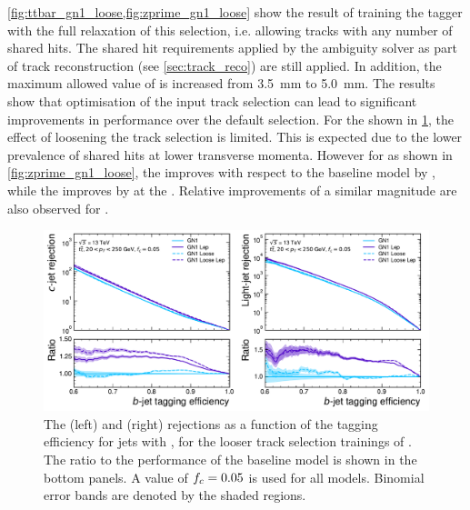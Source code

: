 \cref{fig:ttbar_gn1_loose,fig:zprime_gn1_loose} show the result of training the \GNN tagger with the full relaxation of this selection, i.e. allowing tracks with any number of shared hits.
The shared hit requirements applied by the ambiguity solver as part of track reconstruction (see \cref{sec:track_reco}) are still applied.
In addition, the maximum allowed value of \dzero is increased from \SI{3.5}{\milli\meter} to \SI{5.0}{\milli\meter}.
The results show that optimisation of the input track selection can lead to significant improvements in performance over the default selection.
For the \ttbarjets shown in \cref{fig:ttbar_gn1_loose}, the effect of loosening the track selection is limited.
This is expected due to the lower prevalence of shared hits at lower transverse momenta.
However for \Zprimejets as shown in \cref{fig:zprime_gn1_loose}, the \crej improves with respect to the baseline \GNN model by , while the \lrej improves by  at the .
Relative improvements of a similar magnitude are also observed for \GNNLep.


\begin{figure}[!p]
    \centering
    \includegraphics[width=\textwidth]{chapters/gnn_tagger/figs/gn1_loose_ttbar.pdf}
    \caption{
        The \cjet (left) and \ljet (right) rejections as a function of the \bjet tagging efficiency for \ttbar jets with \ttbarpt, for the looser track selection trainings of \GNN.
        The ratio to the performance of the baseline \GNN model is shown in the bottom panels.
        A value of $f_c = 0.05$ is used for all models.
        Binomial error bands are denoted by the shaded regions.
    }
    \label{fig:ttbar_gn1_loose}
\end{figure}

